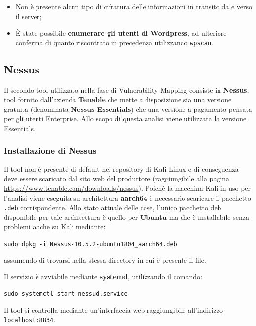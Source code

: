 \documentclass[a4paper, 12pt, oneside]{article}
\begin{document}
\begin{itemize}
    \item Non è presente alcun tipo di cifratura delle informazioni in transito da e verso il server;
    \item È stato possibile \textbf{enumerare gli utenti di Wordpress}, ad ulteriore conferma di quanto riscontrato in precedenza utilizzando \texttt{wpscan}.
\end{itemize}

\subsection{Nessus}
Il secondo tool utilizzato nella fase di Vulnerability Mapping consiste in \textbf{Nessus}, tool fornito dall'azienda \textbf{Tenable} che mette a disposizione sia una versione gratuita (denominata \textbf{Nessus Essentials}) che una versione a pagamento pensata per gli utenti Enterprise. Allo scopo di questa analisi viene utilizzata la versione Essentials.

\subsubsection{Installazione di Nessus}
Il tool non è presente di default nei repository di Kali Linux e di conseguenza deve essere scaricato dal sito web del produttore (raggiungibile alla pagina \url{https://www.tenable.com/downloads/nessus}). Poiché la macchina Kali in uso per l'analisi viene eseguita su architettura \textbf{aarch64} è necessario scaricare il pacchetto \texttt{.deb} corrispondente. Allo stato attuale delle cose, l'unico pacchetto deb disponibile per tale architettura è quello per \textbf{Ubuntu} ma che è installabile senza problemi anche su Kali mediante:

\begin{center}
    \texttt{sudo dpkg -i Nessus-10.5.2-ubuntu1804\_aarch64.deb}
\end{center}

assumendo di trovarsi nella stessa directory in cui è presente il file.

Il servizio è avviabile mediante \textbf{systemd}, utilizzando il comando:

\begin{center}
    \texttt{sudo systemctl start nessud.service}
\end{center}

Il tool si controlla mediante un'interfaccia web raggiungibile all'indirizzo \texttt{localhost:8834}.
\end{document}
